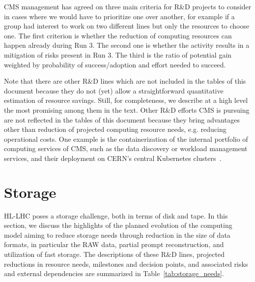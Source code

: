 \documentclass{cmspaper}
\begin{document}

CMS management has agreed on three main criteria for R\&D projects to consider in cases where we would have to prioritize one over another, for example if a group had interest to work on two different lines but only the resources to choose one. The first criterion is whether the reduction of computing resources can happen already during Run 3. The second one is whether the activity results in a mitigation of risks present in Run 3. The third is the ratio of potential gain weighted by probability of success/adoption and effort needed to succeed.

Note that there are other R\&D lines which are not included in the tables of this document because they do not (yet) allow a straightforward quantitative estimation of resource savings. Still, for completeness, we describe at a high level the most promising among them in the text.
Other R\&D efforts CMS is pursuing are not reflected in the tables of this document because they bring advantages other than reduction of projected computing resource needs, e.g. reducing operational costs. One example is the containerization of the internal portfolio of computing services of CMS, such as the data discovery or workload management services, and their deployment on CERN's central Kubernetes clusters~\cite{Imran:2765040}.



\section{Storage}
\label{sec:storage_needs}
HL-LHC poses a storage challenge, both in terms of disk and tape. In this section, we discuss the highlights of the planned evolution of the computing model aiming to reduce storage needs through reduction in the size of data formats, in particular the RAW data, partial prompt reconstruction, and utilization of fast storage. The descriptions of these R\&D lines, projected reductions in resource needs, milestones and decision points, and associated risks and external dependencies are summarized in Table~\ref{tab:storage_needs}.
\end{document}
